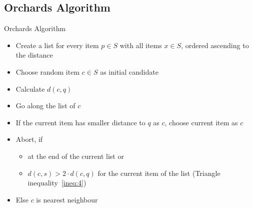 \documentclass[handout]{beamer}
\begin{document}
\subsection{Orchards Algorithm}
\begin{frame}{Orchards Algorithm}
 \begin{itemize}
  \item Create a list for every item $p \in S$ with all items $x \in S$, ordered ascending to the distance
  \pause
  \item Choose random item $c \in S$ as initial candidate
  \pause
  \item Calculate $d(c, q)$
  \pause
  \item Go along the list of $c$
  \pause
  \item If the current item has smaller distance to $q$ as $c$, choose current item as $c$
  \pause
  \item Abort, if
    \begin{itemize}
      \item at the end of the current list or
      \item $d(c, s) > 2 \cdot d(c, q)$ for the current item of the list (Triangle inequality~\ref{ineq:4})
    \end{itemize}
   \pause
   \item Else $c$ is nearest neighbour
 \end{itemize}
\end{frame}
\end{document}
